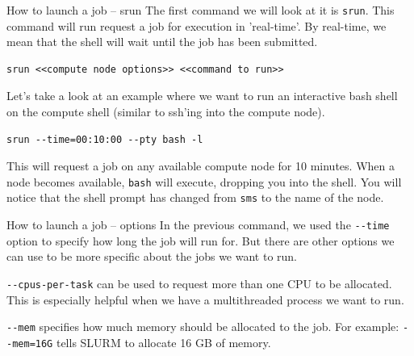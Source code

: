 \documentclass[10pt]{beamer}
\begin{document}
\begin{frame}[label={sec:org8b08a7e},fragile]{How to launch a job -- srun}
 The first command we will look at it is \texttt{srun}. This command will run request a
job for execution in 'real-time'. By real-time, we mean that the shell will wait
until the job has been submitted.

\begin{verbatim}
srun <<compute node options>> <<command to run>>
\end{verbatim}

Let's take a look at an example where we want to run an interactive bash shell
on the compute shell (similar to ssh'ing into the compute node).

\begin{verbatim}
srun --time=00:10:00 --pty bash -l
\end{verbatim}

This will request a job on any available compute node for 10 minutes. When a
node becomes available, \texttt{bash} will execute, dropping you into the shell. You will
notice that the shell prompt has changed from \texttt{sms} to the name of the node.
\end{frame}

\begin{frame}[label={sec:orgc803547},fragile]{How to launch a job -- options}
 In the previous command, we used the \texttt{-{}-time} option to specify how long the job
will run for. But there are other options we can use to be more specific about
the jobs we want to run.

\texttt{-{}-cpus-per-task} can be used to request more than one CPU to be
allocated. This is especially helpful when we have a multithreaded process we
want to run.

\texttt{-{}-mem} specifies how much memory should be allocated to the job. For example:
\texttt{-{}-mem=16G} tells SLURM to allocate 16 GB of memory.
\end{frame}
\end{document}
